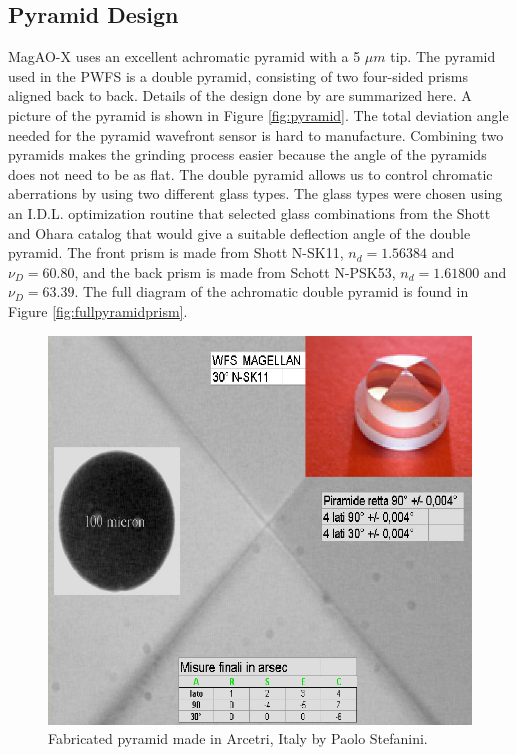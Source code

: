 \subsection{Pyramid Design}
MagAO-X uses an excellent achromatic pyramid with a 5 $\mu m$ tip. The pyramid used in the PWFS is a double pyramid, consisting of two four-sided prisms aligned back to back. Details of the design done by \cite{tozzi2008double} are summarized here. A picture of the pyramid is shown in Figure \ref{fig:pyramid}. The total deviation angle needed for the pyramid wavefront sensor is hard to manufacture. Combining two pyramids makes the grinding process easier because the angle of the pyramids does not need to be as flat. The double pyramid allows us to control chromatic aberrations by using two different glass types. The glass types were chosen using an I.D.L. optimization routine that selected glass combinations from the Shott and Ohara catalog that would give a suitable deflection angle of the double pyramid. The front prism is made from Shott N-SK11, $n_d=1.56384$ and $\nu_D=60.80$, and the back prism is made from Schott N-PSK53, $n_d=1.61800$ and $\nu_D=63.39$. The full diagram of the achromatic double pyramid is found in Figure \ref{fig:fullpyramidprism}.




	
\begin{figure}[h]
	\centering
	\includegraphics[width=.5\textwidth]{Chapter Materials/Chapter Three Materials/pyramidGlass.png}
	\caption{Fabricated pyramid made in Arcetri, Italy by Paolo Stefanini.}
	\label{fig:pyramidprism}
\end{figure}
	
